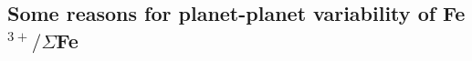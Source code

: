 \documentclass[fleqn,usenatbib,twocolumn]{mnras}
\newcommand{\xfer}{Fe$^{3+}/\Sigma$Fe}
\newcommand{\todo}[1]{\textit{\textcolor{violet}{{#1}}}}
\begin{document}








\subsection{Some reasons for planet-planet variability of \xfer}
\end{document}
